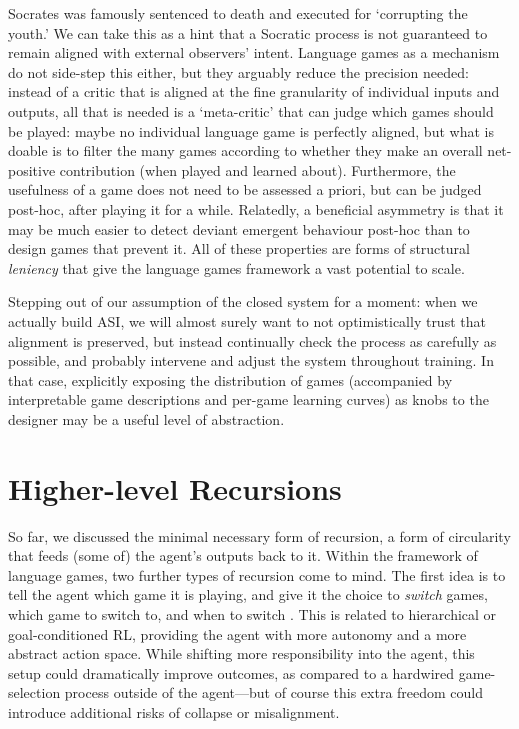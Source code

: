 \documentclass[dvipsnames]{article} %
\begin{document}
Socrates was famously sentenced to death and executed for `corrupting the youth.' We can take this as a hint that a Socratic process is not guaranteed to remain aligned with external observers' intent. Language games as a mechanism do not side-step this either, but they arguably reduce the precision needed: instead of a critic that is aligned at the fine granularity of individual inputs and outputs, all that is needed is a `meta-critic' that can judge which games should be played: maybe no individual language game is perfectly aligned, but what is doable is to filter the many games according to whether they make an overall net-positive contribution (when played and learned about). 
Furthermore, the usefulness of a game does not need to be assessed a priori, but can be judged post-hoc, after playing it for a while. 
Relatedly, a beneficial asymmetry is that it may be much easier to detect deviant emergent behaviour post-hoc than to design games that prevent it. 
All of these properties are forms of structural \emph{leniency} that give the language games framework a vast potential to scale.

Stepping out of our assumption of the closed system for a moment: when we actually build ASI, we will almost surely want to not optimistically trust that alignment is preserved, but instead continually check the process as carefully as possible, and probably intervene and adjust the system throughout training. In that case, explicitly exposing the distribution of games (accompanied by interpretable game descriptions and per-game learning curves) as knobs to the designer may be a useful level of abstraction.



\section{Higher-level Recursions}
So far, we discussed the minimal necessary form of recursion, a form of circularity that feeds (some of) the agent's outputs back to it.
Within the framework of language games, two further types of recursion come to mind. 
The first idea is to tell the agent which game it is playing, and give it the choice to \emph{switch} games, which game to switch to, and when to switch \citep{pislar2021should}.
This is related to hierarchical or goal-conditioned RL, providing the agent with more autonomy and a more abstract action space.
While shifting more responsibility into the agent, this setup could dramatically improve outcomes, as compared to a hardwired game-selection process outside of the agent---but of course this extra freedom could introduce additional risks of collapse or misalignment.
\end{document}
